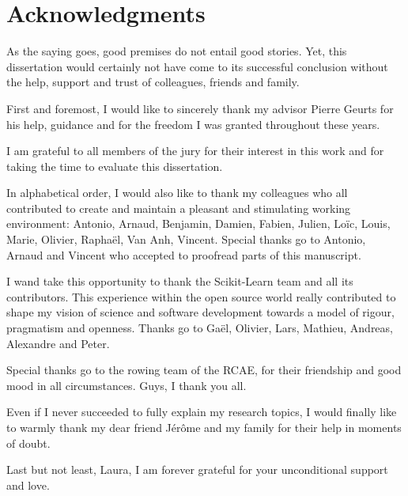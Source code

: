 
\chapter*{Acknowledgments}

As the saying goes, good premises do not entail good stories. Yet, this
dissertation would certainly not have come to its successful conclusion
without the help, support and trust of colleagues, friends and family.

First and foremost, I would like to sincerely thank my advisor Pierre Geurts
for his help, guidance and for the freedom I was granted throughout these
years.

I am grateful to all members of the jury for their interest in this work
and for taking the  time to evaluate this dissertation.

In alphabetical order, I would also like to thank my colleagues who all
contributed to create and maintain a pleasant and stimulating working
environment: Antonio, Arnaud, Benjamin, Damien, Fabien, Julien, Lo\"{i}c,
Louis, Marie, Olivier, Rapha\"{e}l, Van Anh, Vincent. Special thanks go to
Antonio, Arnaud and Vincent who accepted to proofread parts of this manuscript.

I wand take this opportunity to thank the Scikit-Learn team and all its
contributors. This experience within the open source world really contributed
to shape my vision of science and software development towards a model
of rigour, pragmatism and openness. Thanks go to Ga\"{e}l, Olivier, Lars,
Mathieu, Andreas, Alexandre and Peter.

Special thanks go to the rowing team of the RCAE, for their friendship
and good mood in all circumstances. Guys, I thank you all.

Even if I never succeeded to fully explain my research topics, I would finally
like to warmly thank my dear friend J\'er\^{o}me and my family for their help
in moments of doubt.

Last but not least, Laura, I am forever grateful for your unconditional support
and love.

